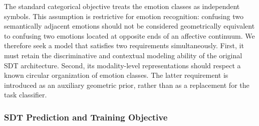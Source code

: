 \documentclass[letterpaper,journal]{IEEEtran}
\begin{document}
The standard categorical objective treats the emotion classes as independent
symbols. This assumption is restrictive for emotion recognition: confusing
two semantically adjacent emotions should not be considered geometrically
equivalent to confusing two emotions located at opposite ends of an affective
continuum. We therefore seek a model that satisfies two requirements
simultaneously. First, it must retain the discriminative and contextual
modeling ability of the original SDT architecture. Second, its modality-level
representations should respect a known circular organization of emotion
classes. The latter requirement is introduced as an auxiliary geometric prior,
rather than as a replacement for the task classifier.

\subsubsection{SDT Prediction and Training Objective}
\end{document}
